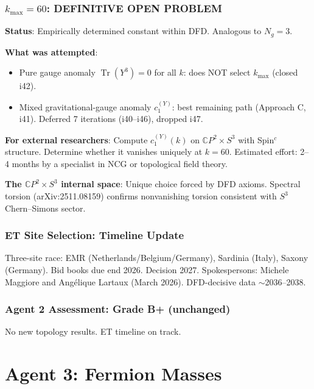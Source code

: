 \documentclass[11pt,a4paper]{article}
\newcommand{\Tr}{\operatorname{Tr}}
\newcommand{\CP}{\mathbb{C}P}
\begin{document}
\section{$k_{\max} = 60$: DEFINITIVE OPEN PROBLEM}

\begin{tcolorbox}[colback=yellow!5!white, colframe=yellow!60!black,
  title={$k_{\max} = 60$: Permanent Open Problem}]

\textbf{Status}: Empirically determined constant within DFD. Analogous to $N_g = 3$.

\textbf{What was attempted}:
\begin{itemize}
\item Pure gauge anomaly $\Tr(Y^3) = 0$ for all $k$: does NOT select $k_{\max}$ (closed i42).
\item Mixed gravitational-gauge anomaly $c_1^{(Y)}$: best remaining path (Approach C, i41). Deferred 7 iterations (i40--i46), dropped i47.
\end{itemize}

\textbf{For external researchers}: Compute $c_1^{(Y)}(k)$ on $\CP^2 \times S^3$ with Spin$^c$ structure. Determine whether it vanishes uniquely at $k = 60$. Estimated effort: 2--4 months by a specialist in NCG or topological field theory.

\textbf{The $\CP^2 \times S^3$ internal space}: Unique choice forced by DFD axioms. Spectral torsion (arXiv:2511.08159) confirms nonvanishing torsion consistent with $S^3$ Chern--Simons sector.
\end{tcolorbox}

\section{ET Site Selection: Timeline Update}

Three-site race: EMR (Netherlands/Belgium/Germany), Sardinia (Italy), Saxony (Germany). Bid books due end 2026. Decision 2027. Spokespersons: Michele Maggiore and Ang\'elique Lartaux (March 2026). DFD-decisive data $\sim$2036--2038.

\section{Agent 2 Assessment: Grade B+ (unchanged)}

No new topology results. ET timeline on track.


\part{Agent 3: Fermion Masses}
\label{part:agent3}
\end{document}
